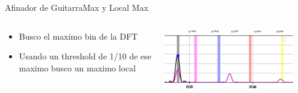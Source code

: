 \begin{frame}[t]{Afinador de Guitarra}{Max y Local Max}
   \footnotesize
   \begin{columns}
      \begin{column}{.5\textwidth}
         \begin{itemize}
            \item{Busco el maximo bin de la DFT}
            \item{Usando un threshold de 1/10 de ese maximo busco un maximo local}
         \end{itemize}
      
      \end{column}
      \begin{column}{.5\textwidth}
         \includegraphics[width=0.9\textwidth]{7_clase/local_max}
      \end{column}
   \end{columns}
   \vfill
   \note{
      \begin{itemize}
         \item{}
         \item{}
      \end{itemize}
   }
\end{frame}
